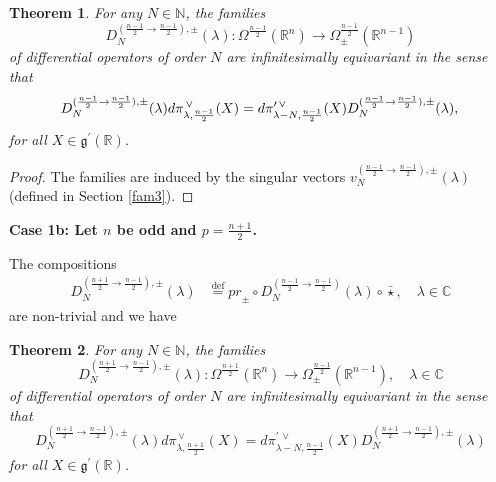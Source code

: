 \documentclass[a4paper,12pt,reqno]{amsart}
\newtheorem{theorem}{Theorem}
\numberwithin{theorem}{subsection}
\numberwithin{equation}{section}
\begin{document}
\begin{theorem}\label{CSBO-cas1} For any $N\in{\mathbb{N}}$, the families
\begin{equation*}
   D^{(\frac{n-1}{2}\to \frac{n-1}{2}),{\pm}}_N(\lambda):
   \Omega^{\frac{n-1}{2}}({\mathbb{R}}^{n}) \to \Omega^{\frac{n-1}{2}}_{\pm}({\mathbb{R}}^{n-1})
\end{equation*}
of differential operators of order $N$ are infinitesimally equivariant in the
sense that
\begin{equation*}
   D^{(\frac{n-1}{2} \to \frac{n-1}{2}),{\pm}}_N(\lambda) {d}\pi^{{\,\vee}}_{\lambda,\frac{n-1}{2}}(X)
   = {d} \pi^{\prime{{\,\vee}}}_{\lambda-N,\frac{n-1}{2}}(X)  D^{(\frac{n-1}{2}\to \frac{n-1}{2}),{\pm}}_N(\lambda),\\
\end{equation*}
for all $X\in{{\mathfrak g}}^\prime({\mathbb{R}})$.
\end{theorem}

\begin{proof} The families are induced by the singular vectors
$v_N^{(\frac{n-1}{2} \to \frac{n-1}{2}),\pm}(\lambda)$ (defined in Section
\ref{fam3}).
\end{proof}

{\bf Case 1b: Let $n$ be odd and $p=\frac{n+1}{2}$.}

The compositions
\begin{align*}
   D^{(\frac{n+1}{2}\to \frac{n-1}{2}),{\pm}}_N(\lambda)
   & {\stackrel{\text{def}}{=}} {pr}_\pm\circ D^{(\frac{n-1}{2}\to \frac{n-1}{2})}_N(\lambda)\circ \bar{\star}, \quad \lambda \in {\mathbb{C}}
\end{align*}
are non-trivial and we have

\begin{theorem}\label{CSBO-case2} For any $N\in{\mathbb{N}}$, the families
\begin{equation*}
   D^{(\frac{n+1}{2}\to \frac{n-1}{2}),\pm}_N(\lambda):
   \Omega^{\frac{n+1}{2}}({\mathbb{R}}^{n}) \to \Omega^{\frac{n-1}{2}}_\pm({\mathbb{R}}^{n-1}), \quad \lambda \in {\mathbb{C}}
\end{equation*}
of differential operators of order $N$ are infinitesimally equivariant in the
sense that
\begin{equation*}
   D^{(\frac{n+1}{2}\to \frac{n-1}{2}),\pm}_N(\lambda) {d} \pi^{{\,\vee}}_{\lambda,\frac{n+1}{2}}(X)
   = {d} \pi^{\prime{{\,\vee}}}_{\lambda-N,\frac{n-1}{2}}(X)  D^{(\frac{n+1}{2}\to \frac{n-1}{2}),\pm}_N(\lambda)
\end{equation*}
for all $X\in{{\mathfrak g}}^\prime({\mathbb{R}})$.
\end{theorem}
\end{document}
